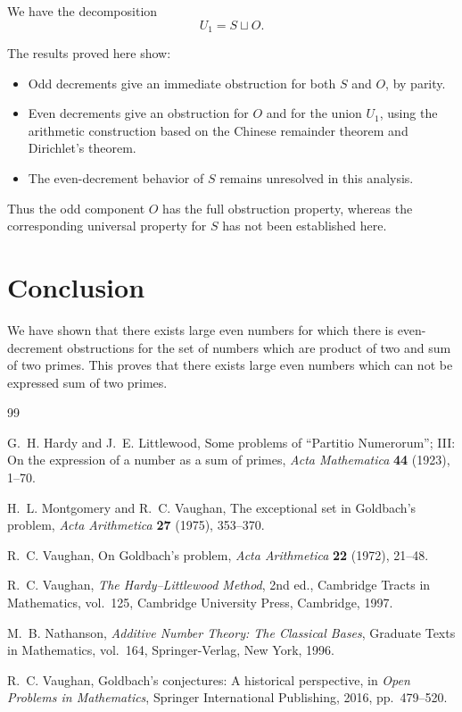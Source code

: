 \documentclass[11pt]{article}
\begin{document}
	
	We have the decomposition
	\[
	\boxed{U_1=S\sqcup O}.
	\]
	
	The results proved here show:
	\begin{itemize}
		\item Odd decrements give an immediate obstruction for
		both $S$ and $O$, by parity.
		\item Even decrements give an obstruction for $O$ and
		for the union $U_1$, using the arithmetic construction
		based on the Chinese remainder theorem and Dirichlet's
		theorem.
		\item The even-decrement behavior of $S$ remains
		unresolved in this analysis.
	\end{itemize}
	
	Thus the odd component $O$ has the full obstruction property,
	whereas the corresponding universal property for $S$ has not
	been established here.
	
	\section{Conclusion}
	We have shown that there exists large even numbers for which there is even-decrement obstructions for the set of numbers which are product of two and sum of two primes. This proves that there exists large even numbers which can not be expressed sum of two primes.	
	
	\begin{thebibliography}{99}
		
		G.~H. Hardy and J.~E. Littlewood,
		\newblock Some problems of ``Partitio Numerorum'';
		III: On the expression of a number as a sum of primes,
		\newblock \emph{Acta Mathematica} \textbf{44} (1923), 1--70.
		
		H.~L. Montgomery and R.~C. Vaughan,
		\newblock The exceptional set in Goldbach's problem,
		\newblock \emph{Acta Arithmetica} \textbf{27} (1975), 353--370.
		
		R.~C. Vaughan,
		\newblock On Goldbach's problem,
		\newblock \emph{Acta Arithmetica} \textbf{22} (1972), 21--48.
		
		R.~C. Vaughan,
		\newblock \emph{The Hardy--Littlewood Method},
		\newblock 2nd ed., Cambridge Tracts in Mathematics,
		vol.~125, Cambridge University Press, Cambridge, 1997.
		
		M.~B. Nathanson,
		\newblock \emph{Additive Number Theory: The Classical Bases},
		\newblock Graduate Texts in Mathematics, vol.~164,
		Springer-Verlag, New York, 1996.
		
		R.~C. Vaughan,
		\newblock Goldbach's conjectures: A historical perspective,
		\newblock in \emph{Open Problems in Mathematics},
		Springer International Publishing, 2016, pp.~479--520.
		
	\end{thebibliography}
	
\end{document}
